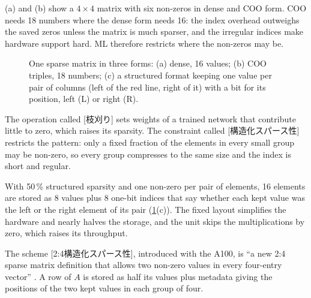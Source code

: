 \documentclass[../main.tex]{subfiles}
\begin{document}
(a) and (b) show a $4 \times 4$ matrix with six
non-zeros in dense and COO form.  COO needs 18 numbers where the dense
form needs 16: the index overhead outweighs the saved zeros unless the
matrix is much sparser, and the irregular indices make hardware support
hard.  ML therefore restricts where the non-zeros may be.

\begin{figure}[tb]
  \centering
  
  \caption{One sparse matrix in three forms: (a) dense, 16 values; (b)
    COO triples, 18 numbers; (c) a structured format keeping one value
    per pair of columns (left of the red line, right of it) with a bit
    for its position, left (L) or right (R).}
  \label{fig:l12-sparse}
\end{figure}

\begin{definition}
  The operation called [枝刈り] sets weights of a trained
  network that contribute little to zero, which raises its sparsity.
  The constraint called [構造化スパース性]
  restricts the pattern:
  only a fixed fraction of the elements in every small group may be
  non-zero, so every group compresses to the same size and the index is
  short and regular.
\end{definition}

With 50\,\% structured sparsity and one non-zero per pair of elements,
16 elements are stored as 8 values plus 8 one-bit indices that say
whether each kept value was the left or the right element of its pair
(\cref{fig:l12-sparse}(c)).  The fixed layout simplifies the hardware
and nearly halves the storage, and the unit skips the multiplications by
zero, which raises its throughput.

\begin{definition}
  The scheme [2:4構造化スパース性], introduced with
  the A100, is \enquote{a new 2:4 sparse matrix definition that allows
  two non-zero values in every four-entry vector}
  \cite{nvidia2020ampere}.  A row of $A$ is stored as half its values
  plus metadata giving the positions of the two kept values in each
  group of four.
\end{definition}
\end{document}
